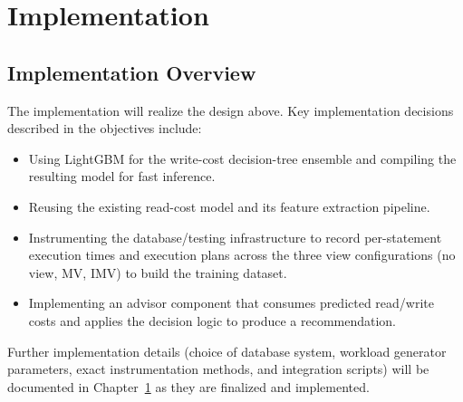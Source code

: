 \chapter{Implementation}
\label{chap:implementation}

\section{Implementation Overview}
\label{sec:implementationOverview}

The implementation will realize the design above. Key implementation decisions described in the objectives include:

\begin{itemize}
    \item Using LightGBM for the write-cost decision-tree ensemble and compiling the resulting model for fast inference.
    \item Reusing the existing read-cost model and its feature extraction pipeline.
    \item Instrumenting the database/testing infrastructure to record per-statement execution times and execution plans across the three view configurations (no view, \ac{MV}, \ac{IMV}) to build the training dataset.
    \item Implementing an advisor component that consumes predicted read/write costs and applies the decision logic to produce a recommendation.
\end{itemize}

Further implementation details (choice of database system, workload generator parameters, exact instrumentation methods, and integration scripts) will be documented in Chapter~\ref{chap:implementation} as they are finalized and implemented.
